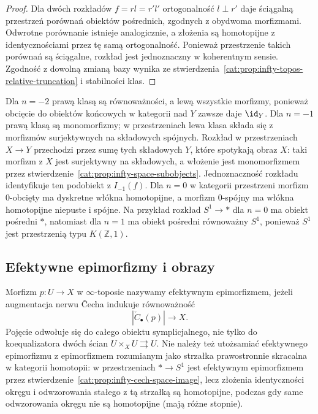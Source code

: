 \begin{proof}
Dla dwóch rozkładów $f=r l=r'l'$ ortogonalność $l\perp r'$ daje ściągalną przestrzeń porównań obiektów pośrednich, zgodnych z obydwoma morfizmami. Odwrotne porównanie istnieje analogicznie, a złożenia są homotopijne z identycznościami przez tę samą ortogonalność. Ponieważ przestrzenie takich porównań są ściągalne, rozkład jest jednoznaczny w koherentnym sensie. Zgodność z dowolną zmianą bazy wynika ze stwierdzenia~\ref{cat:prop:infty-topos-relative-truncation} i stabilności klas.
\end{proof}

\begin{przyklad}\label{cat:ex:infty-topos-low-truncations}
Dla $n=-2$ prawą klasą są równoważności, a lewą wszystkie morfizmy, ponieważ obcięcie do obiektów końcowych w kategorii nad $Y$ zawsze daje $\id_Y$. Dla $n=-1$ prawą klasą są monomorfizmy; w przestrzeniach lewa klasa składa się z morfizmów surjektywnych na składowych spójnych. Rozkład w przestrzeniach $X\to Y$ przechodzi przez sumę tych składowych $Y$, które spotykają obraz $X$: taki morfizm z $X$ jest surjektywny na składowych, a włożenie jest monomorfizmem przez stwierdzenie~\ref{cat:prop:infty-space-subobjects}. Jednoznaczność rozkładu identyfikuje ten podobiekt z $I_{-1}(f)$. Dla $n=0$ w kategorii przestrzeni morfizm $0$-obcięty ma dyskretne włókna homotopijne, a morfizm $0$-spójny ma włókna homotopijne niepuste i spójne. Na przykład rozkład $S^1\to *$ dla $n=0$ ma obiekt pośredni $*$, natomiast dla $n=1$ ma obiekt pośredni równoważny $S^1$, ponieważ $S^1$ jest przestrzenią typu $K(\mathbb Z,1)$.
\end{przyklad}

\subsection{Efektywne epimorfizmy i obrazy}

\begin{definicja}\label{cat:def:infty-topos-effective-epi}
Morfizm $p:U\to X$ w $\infty$-toposie nazywamy efektywnym epimorfizmem, jeżeli augmentacja nerwu Čecha indukuje równoważność
\[
 |\check C_\bullet(p)|\longrightarrow X.
\]
Pojęcie odwołuje się do całego obiektu symplicjalnego, nie tylko do koequalizatora dwóch ścian $U\times_X U\rightrightarrows U$. Nie należy też utożsamiać efektywnego epimorfizmu z epimorfizmem rozumianym jako strzałka prawostronnie skracalna w kategorii homotopii: w przestrzeniach $*\to S^1$ jest efektywnym epimorfizmem przez stwierdzenie~\ref{cat:prop:infty-cech-space-image}, lecz złożenia identyczności okręgu i odwzorowania stałego z tą strzałką są homotopijne, podczas gdy same odwzorowania okręgu nie są homotopijne (mają różne stopnie).
\end{definicja}

